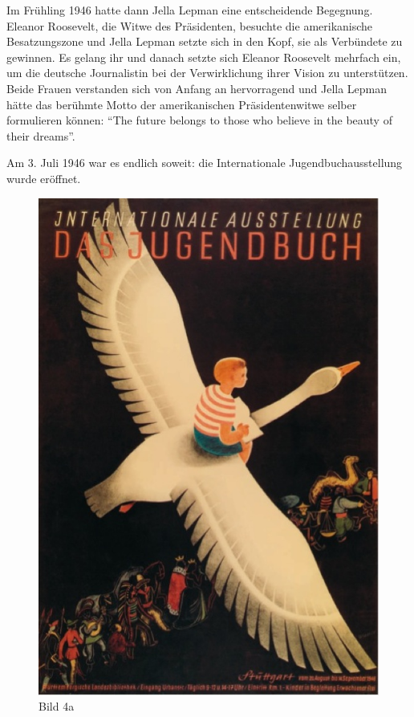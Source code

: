 \documentclass[a4paper,
fontsize=11pt,
oneside,
numbers=noperiodatend,
parskip=half-,
bibliography=totoc,
final
]{scrartcl}
\begin{document}
Im Frühling 1946 hatte dann Jella Lepman eine entscheidende Begegnung.
Eleanor Roosevelt, die Witwe des Präsidenten, besuchte die amerikanische
Besatzungszone und Jella Lepman setzte sich in den Kopf, sie als
Verbündete zu gewinnen. Es gelang ihr und danach setzte sich Eleanor
Roosevelt mehrfach ein, um die deutsche Journalistin bei der
Verwirklichung ihrer Vision zu unterstützen. Beide Frauen verstanden
sich von Anfang an hervorragend und Jella Lepman hätte das berühmte
Motto der amerikanischen Präsidentenwitwe selber formulieren können:
\enquote{The future belongs to those who believe in the beauty of their
dreams}.

Am 3. Juli 1946 war es endlich soweit: die Internationale
Jugendbuchausstellung wurde eröffnet.

\begin{figure}[htbp]
\centering
\includegraphics{img/Bild4a.jpg}
\caption{Bild 4a}
\end{figure}
\end{document}
